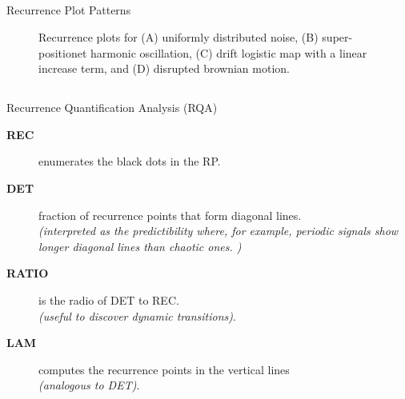 \subsection{}
{

\begin{frame}{Recurrence Plot Patterns}
    \begin{figure}
	\caption{Recurrence plots for (A) uniformly distributed noise,
		(B) super-positionet harmonic oscillation,
		(C) drift logistic map with a linear increase term, and
		(D) disrupted brownian motion.
		} 
   \end{figure}
	
\end{frame}
}



\subsection{}
{

\begin{frame}{Recurrence Quantification Analysis (RQA)}

\begin{description}
\item [ \textbf{REC} ] enumerates the black dots in the RP.
\item [ \textbf{DET} ] fraction of recurrence points that form diagonal lines. \\
			\textit{(interpreted as the predictibility where, for example,
				periodic signals show longer diagonal lines 
				than chaotic ones.
				)}
\item [ \textbf{RATIO} ] is the radio of DET to REC. \\
			\textit{(useful to discover dynamic transitions)}.
\item [ \textbf{LAM} ] computes the recurrence points in the vertical lines \\
			\textit{(analogous to DET)}.
\end{description}


	
\end{frame}
}






